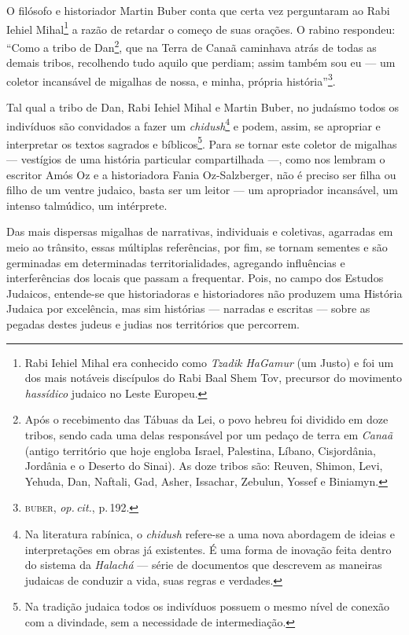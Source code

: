\noindent{}O filósofo e historiador Martin Buber conta que certa vez perguntaram ao
Rabi Iehiel Mihal\footnote{Rabi Iehiel Mihal era conhecido como
  \emph{Tzadik HaGamur} (um Justo) e foi um dos mais notáveis discípulos
  do Rabi Baal Shem Tov, precursor do movimento \emph{hassídico} judaico
  no Leste Europeu.} a razão de retardar o começo de suas orações. O
rabino respondeu: ``Como a tribo de Dan\footnote{Após o
  recebimento das Tábuas da Lei, o povo hebreu foi dividido em doze
  tribos, sendo cada uma delas responsável por um pedaço de terra em
  \emph{Canaã} (antigo território que hoje engloba Israel, Palestina,
  Líbano, Cisjordânia, Jordânia e o Deserto do Sinai). As doze tribos
  são: Reuven, Shimon, Levi, Yehuda, Dan, Naftali, Gad, Asher,
  Issachar, Zebulun, Yossef e Biniamyn.}, que na Terra de Canaã
caminhava atrás de todas as demais tribos, recolhendo tudo aquilo que
perdiam; assim também sou eu --- um coletor incansável de migalhas de
nossa, e minha, própria história''\footnote{\textsc{buber}, \emph{op.\,cit.}, p.\,192.}.

Tal qual a tribo de Dan, Rabi Iehiel Mihal e Martin Buber, no judaísmo
todos os indivíduos são convidados a fazer um \emph{chidush}\footnote{Na
  literatura rabínica, o \emph{chidush} refere-se a uma nova abordagem
  de ideias e interpretações em obras já existentes. É uma forma de
  inovação feita dentro do sistema da \emph{Halachá} --- série de
  documentos que descrevem as maneiras judaicas de conduzir a vida, suas
  regras e verdades.} e podem, assim, se apropriar e interpretar os
textos sagrados e bíblicos\footnote{Na tradição judaica todos os
  indivíduos possuem o mesmo nível de conexão com a divindade, sem a
  necessidade de intermediação.}. Para se tornar este coletor de
migalhas --- vestígios de uma história particular compartilhada ---,
como nos lembram o escritor Amós Oz e a historiadora Fania
Oz-Salzberger, não é preciso ser filha ou filho de um ventre judaico,
basta ser um leitor --- um apropriador incansável, um intenso
talmúdico, um intérprete.

Das mais dispersas migalhas de narrativas, individuais e coletivas,
agarradas em meio ao trânsito, essas múltiplas referências, por fim, se
tornam sementes e são germinadas em determinadas territorialidades,
agregando influências e interferências dos locais que passam a
frequentar. Pois, no campo dos Estudos Judaicos, entende-se que
historiadoras e historiadores não produzem uma História Judaica por
excelência, mas sim histórias --- narradas e escritas --- sobre as
pegadas destes judeus e judias nos territórios que percorrem.

